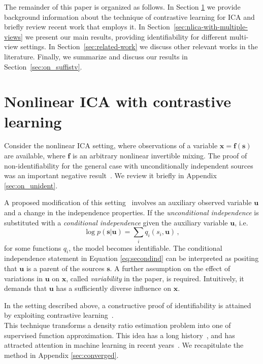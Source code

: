 The remainder of this paper is organized as follows.
In Section \ref{sec:nlica} we provide background information about the technique of contrastive learning for ICA and briefly review recent work that employs it.
In Section~\ref{sec:nlica-with-multiple-views} we present our main results, providing identifiability for different multi-view settings.
In Section~\ref{sec:related-work} we discuss other relevant works in the literature.
Finally, we summarize and discuss our results in Section~\ref{sec:on_suffistv}.


\section{Nonlinear ICA with contrastive learning}
\label{sec:nlica}

Consider the nonlinear ICA setting, where observations of a variable $\bm{x} = \bm{f}(\bm{s})$ are available, where $\bm{f}$ is an arbitrary nonlinear invertible mixing. The proof of non-identifiability for the general case with unconditionally independent sources was an important negative result~\cite{hyvarinen1999nonlinear}. We review it briefly in Appendix \ref{sec:on_unident}.

A proposed modification of this setting~\cite{hyvarinen19a} involves an auxiliary observed variable $\bm{u}$ and a change in the independence properties. If the \textit{unconditional independence} is substituted with a \textit{conditional independence} given the auxiliary variable $\bm{u}$, i.e.
\begin{equation}
    \log p( \bm{s} | \bm{u}) = \sum_i q_i(s_i, \bm{u})\,,\label{eq:secondind}
\end{equation}
for some functions $q_i$, the model becomes identifiable. The conditional independence statement in Equation \ref{eq:secondind} can be interpreted as positing that $\bm{u}$ is a parent of the sources $\bm{s}$. A further assumption on the effect of variations in $\bm{u}$ on $\bm{x}$, called \textit{variability} in the paper, is required. Intuitively, it demands that $\bm{u}$ has a sufficiently diverse influence on $\bm{x}$.

In the setting described above, a constructive proof of identifiability is attained by exploiting contrastive learning~\cite{gutmann2010noise}.\\\label{sec:contr_learn}
This technique transforms a density ratio estimation problem into one of supervised function approximation. This idea has a long history~\cite{friedman2001elements}, and has attracted attention in machine learning in recent years~\cite{goodfellow2014generative, gutmann2010noise}. We recapitulate the method in Appendix \ref{sec:converged}.

